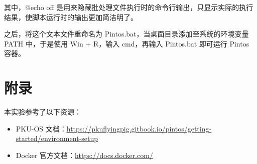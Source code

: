 其中，@echo off 是用来隐藏批处理文件执行时的命令行输出，只显示实际的执行结果，使脚本运行时的输出更加简洁明了。

之后，将这个文本文件重命名为 Pintos.bat，当桌面目录添加至系统的环境变量 PATH 中，于是使用 Win + R，输入 cmd，再输入 Pintos.bat 即可运行 Pintos 容器。

\section{附录}

本实验参考了以下资源：
\begin{itemize}
  \item PKU-OS 文档：\href{https://pkuflyingpig.gitbook.io/pintos/getting-started/environment-setup}{\underline{https://pkuflyingpig.gitbook.io/pintos/getting-started/environment-setup}}
  \item Docker 官方文档：\href{https://docs.docker.com/}{\underline{https://docs.docker.com/}}
\end{itemize}

